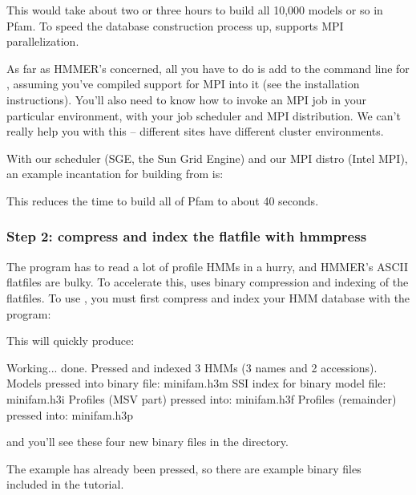 
This would take about two or three hours to build all 10,000 models or
so in Pfam.  To speed the database construction process up,
 supports MPI parallelization. 

As far as HMMER's concerned, all you have to do is add  to
the command line for , assuming you've compiled support
for MPI into it (see the installation instructions).  You'll also need
to know how to invoke an MPI job in your particular environment, with
your job scheduler and MPI distribution. We can't really help you with
this -- different sites have different cluster environments.

With our scheduler (SGE, the Sun Grid Engine) and our MPI distro
(Intel MPI), an example incantation for building  from
 is:


This reduces the time to build all of Pfam to about 40 seconds.

\subsubsection{Step 2: compress and index the flatfile with hmmpress}

The  program has to read a lot of profile HMMs in a
hurry, and HMMER's ASCII flatfiles are bulky. To accelerate this,
 uses binary compression and indexing of the flatfiles.
To use , you must first compress and index your HMM
database with the  program:


This will quickly produce:

\begin{sreoutput}
Working...    done.
Pressed and indexed 3 HMMs (3 names and 2 accessions).
Models pressed into binary file:   minifam.h3m
SSI index for binary model file:   minifam.h3i
Profiles (MSV part) pressed into:  minifam.h3f
Profiles (remainder) pressed into: minifam.h3p
\end{sreoutput}

and you'll see these four new binary files in the directory. 

The  example has already been pressed, so there
are example binary files\\
included in the tutorial.

